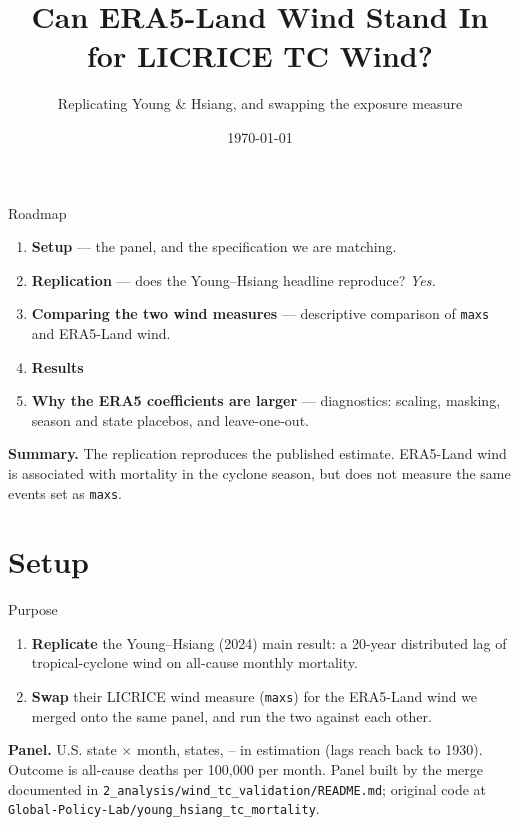 \documentclass[10pt, aspectratio=169]{beamer}
\title{Can ERA5-Land Wind Stand In for LICRICE TC Wind?}
\subtitle{Replicating Young \& Hsiang, and swapping the exposure measure}
\date{\today}
\begin{document}
\begin{frame}[plain]
  \titlepage
\end{frame}

\begin{frame}{Roadmap}
  \begin{enumerate}
    \item \textbf{Setup} --- the panel, and the specification we are matching.
    \item \textbf{Replication} --- does the Young--Hsiang headline reproduce? \emph{Yes.}
    \item \textbf{Comparing the two wind measures} --- descriptive comparison of \texttt{maxs} and ERA5-Land wind.
    \item \textbf{Results}
    \item \textbf{Why the ERA5 coefficients are larger} --- diagnostics: scaling, masking, season and state placebos, and leave-one-out.
  \end{enumerate}
  \vfill
  \footnotesize
  \textbf{Summary.} 
  The replication reproduces the published estimate. ERA5-Land wind is associated with mortality in the cyclone season, but does not measure the same events set as \texttt{maxs}.
\end{frame}

\section{Setup}

\begin{frame}{Purpose}
  \begin{enumerate}
    \item \textbf{Replicate} the Young--Hsiang (2024) main result: a 20-year
          distributed lag of tropical-cyclone wind on all-cause monthly
          mortality.
    \item \textbf{Swap} their LICRICE wind measure (\texttt{maxs}) for the
          ERA5-Land wind we merged onto the same panel, and run the two
          against each other.
  \end{enumerate}
  \vfill
  \textbf{Panel.} U.S. state $\times$ month, \yhStates{} states,
  \yhYearLo--\yhYearHi{} in estimation (lags reach back to 1930).
  Outcome is all-cause deaths per 100,000 per month.
  \vfill
  \footnotesize
  Panel built by the merge documented in
  \texttt{2\_analysis/wind\_tc\_validation/README.md}; original code at
  \texttt{Global-Policy-Lab/young\_hsiang\_tc\_mortality}.
\end{frame}
\end{document}
